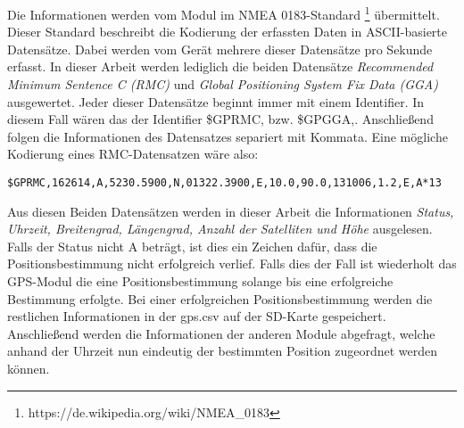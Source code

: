 \documentclass[a4paper,11pt, ngerman]{scrartcl}
\begin{document}
Die Informationen werden vom Modul im NMEA 0183-Standard \footnote{https://de.wikipedia.org/wiki/NMEA\_0183} übermittelt. Dieser Standard beschreibt die Kodierung der erfassten Daten in ASCII-basierte Datensätze. Dabei werden vom Gerät mehrere dieser Datensätze pro Sekunde erfasst. In dieser Arbeit werden lediglich die beiden Datensätze \textit{Recommended Minimum Sentence C (RMC)} und \textit{Global Positioning System Fix Data (GGA)} ausgewertet. Jeder dieser Datensätze beginnt immer mit einem Identifier. In diesem Fall wären das der Identifier \grqq \$GPRMC,\grqq{} bzw. \grqq \$GPGGA,\grqq{}. Anschließend folgen die Informationen des Datensatzes separiert mit Kommata. Eine mögliche Kodierung eines RMC-Datensatzen wäre also:
\begin{lstlisting}
$GPRMC,162614,A,5230.5900,N,01322.3900,E,10.0,90.0,131006,1.2,E,A*13
\end{lstlisting}
Aus diesen Beiden Datensätzen werden in dieser Arbeit die Informationen \textit{Status, Uhrzeit, Breitengrad, Längengrad, Anzahl der Satelliten und Höhe} ausgelesen. Falls der Status nicht \grqq A\grqq{} beträgt, ist dies ein Zeichen dafür, dass die Positionsbestimmung nicht erfolgreich verlief. Falls dies der Fall ist wiederholt das GPS-Modul die eine Positionsbestimmung solange bis eine erfolgreiche Bestimmung erfolgte. Bei einer erfolgreichen Positionsbestimmung werden die restlichen Informationen in der \grqq gps.csv\grqq{} auf der SD-Karte gespeichert. Anschließend werden die Informationen der anderen Module abgefragt, welche anhand der Uhrzeit nun eindeutig der bestimmten Position zugeordnet werden können.
\end{document}
